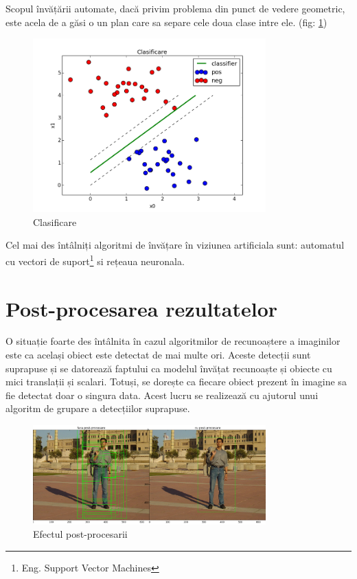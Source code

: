 Scopul învățării automate, dacă privim problema din punct de vedere geometric, este acela de a găsi o un plan care sa separe cele doua clase intre ele. (fig: \ref{fig:fig_clasificare})

\begin{figure}[h]
	\centering
		\includegraphics[width=0.8\textwidth]{imagini/fig_clasificare2.png}
	\caption{Clasificare}
	\label{fig:fig_clasificare}
\end{figure}

Cel mai des întâlniți algoritmi de învățare în viziunea artificiala sunt: automatul cu vectori de suport\cite{suykens1999least}\footnote{Eng. Support Vector Machines} si rețeaua neuronala.

\pagebreak
\section{Post-procesarea rezultatelor}

O situație foarte des întâlnita în cazul algoritmilor de recunoaștere a imaginilor este ca același obiect este detectat de mai multe ori.
Aceste detecții sunt suprapuse și se datorează faptului ca modelul învățat recunoaște și obiecte cu mici translații și scalari.
Totuși, se dorește ca fiecare obiect prezent în imagine sa fie detectat doar o singura data.
Acest lucru se realizează cu ajutorul unui algoritm de grupare a detecțiilor suprapuse.
\begin{figure}[h]
	\centering
		\includegraphics[width=0.8\textwidth]{imagini/nms.png}
	\caption{Efectul post-procesarii}
	\label{fig:nms}
\end{figure}


